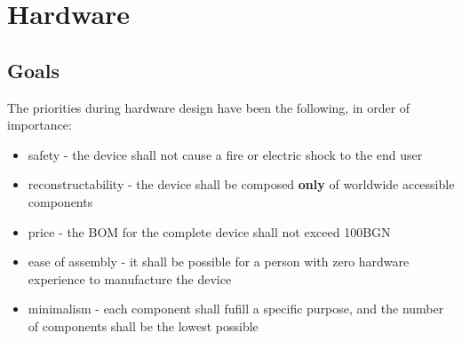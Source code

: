 \section{Hardware}
\subsection{Goals}
The priorities during hardware design have been the following, in order of importance:
\begin{itemize}
\item{safety - the device shall not cause a fire or electric shock to the end user}
\item{reconstructability - the device shall be composed \textbf{only} of worldwide accessible components}
\item{price - the BOM for the complete device shall not exceed 100BGN}
\item{ease of assembly - it shall be possible for a person with zero hardware experience to manufacture the device}
\item{minimalism - each component shall fufill a specific purpose, and the number of components shall be the lowest possible}
\end{itemize}
